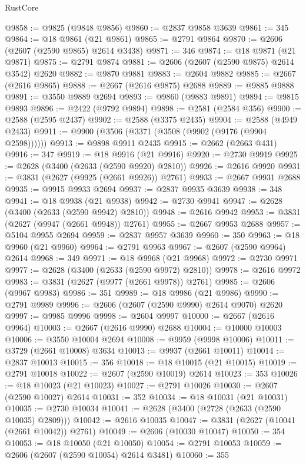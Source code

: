 \begin{lexlean}{RustCore}
\begin{coremodule}
@9858 := @9825 (@9848 @9856)
@9860 := @2837 @9858 @3639
@9861 := 345
@9864 := @18 @9861 (@21 @9861)
@9865 := @2791 @9864
@9870 := @2606 (@2607 (@2590 @9865) @2614 @3438)
@9871 := 346
@9874 := @18 @9871 (@21 @9871)
@9875 := @2791 @9874
@9881 := @2606 (@2607 (@2590 @9875) @2614 @3542) @2620
@9882 := @9870 @9881
@9883 := @2604 @9882
@9885 := @2667 (@2616 @9865)
@9888 := @2667 (@2616 @9875) @2688
@9889 := @9885 @9888
@9891 := @3550 @9889 @2694
@9893 := @9860 (@9883 @9891)
@9894 := @9815 @9893
@9896 := @2422 (@9792 @9894)
@9898 := @2581 (@2584 @356)
@9900 := @2588 (@2595 @2437)
@9902 := @2588 (@3375 @2435)
@9904 := @2588 (@4949 @2433)
@9911 := @9900 (@3506 (@3371 (@3508 (@9902 (@9176 (@9904 @2598))))))
@9913 := @9898 @9911 @2435
@9915 := @2662 (@2663 @431)
@9916 := 347
@9919 := @18 @9916 (@21 @9916)
@9920 := @2730 @9919
@9925 := @2628 (@3400 (@2633 (@2590 @9920) @2810))
@9926 := @2616 @9920
@9931 := @3831 (@2627 (@9925 (@2661 @9926)) @2761)
@9933 := @2667 @9931 @2688
@9935 := @9915 @9933 @2694
@9937 := @2837 @9935 @3639
@9938 := 348
@9941 := @18 @9938 (@21 @9938)
@9942 := @2730 @9941
@9947 := @2628 (@3400 (@2633 (@2590 @9942) @2810))
@9948 := @2616 @9942
@9953 := @3831 (@2627 (@9947 (@2661 @9948)) @2761)
@9955 := @2667 @9953 @2688
@9957 := @5104 @9955 @2694
@9959 := @2837 @9957 @3639
@9960 := 350
@9963 := @18 @9960 (@21 @9960)
@9964 := @2791 @9963
@9967 := @2607 (@2590 @9964) @2614
@9968 := 349
@9971 := @18 @9968 (@21 @9968)
@9972 := @2730 @9971
@9977 := @2628 (@3400 (@2633 (@2590 @9972) @2810))
@9978 := @2616 @9972
@9983 := @3831 (@2627 (@9977 (@2661 @9978)) @2761)
@9985 := @2606 (@9967 @9983)
@9986 := 351
@9989 := @18 @9986 (@21 @9986)
@9990 := @2791 @9989
@9996 := @2606 (@2607 (@2590 @9990) @2614 @9070) @2620
@9997 := @9985 @9996
@9998 := @2604 @9997
@10000 := @2667 (@2616 @9964)
@10003 := @2667 (@2616 @9990) @2688
@10004 := @10000 @10003
@10006 := @3550 @10004 @2694
@10008 := @9959 (@9998 @10006)
@10011 := @3729 (@2661 @10008) @3634
@10013 := @9937 (@2661 @10011)
@10014 := @2837 @10013
@10015 := 356
@10018 := @18 @10015 (@21 @10015)
@10019 := @2791 @10018
@10022 := @2607 (@2590 @10019) @2614
@10023 := 353
@10026 := @18 @10023 (@21 @10023)
@10027 := @2791 @10026
@10030 := @2607 (@2590 @10027) @2614
@10031 := 352
@10034 := @18 @10031 (@21 @10031)
@10035 := @2730 @10034
@10041 := @2628 (@3400 (@2728 (@2633 (@2590 @10035) @2809)))
@10042 := @2616 @10035
@10047 := @3831 (@2627 (@10041 (@2661 @10042)) @2761)
@10049 := @2606 (@10030 @10047)
@10050 := 354
@10053 := @18 @10050 (@21 @10050)
@10054 := @2791 @10053
@10059 := @2606 (@2607 (@2590 @10054) @2614 @3481)
@10060 := 355

\end{coremodule}
\end{lexlean}
